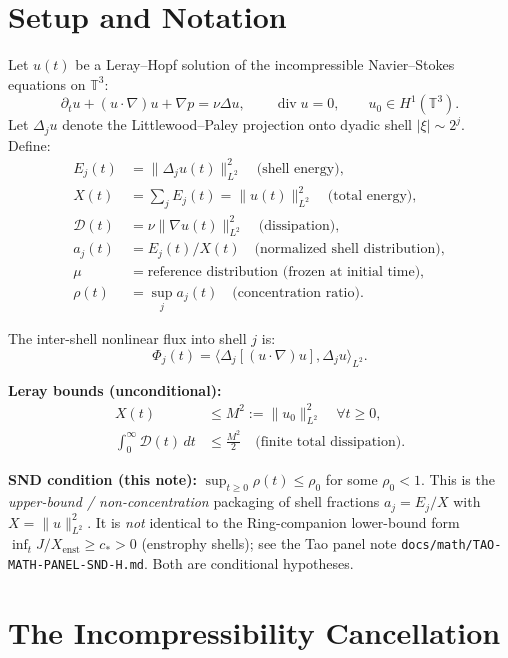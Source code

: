 \documentclass[11pt]{article}
\begin{document}
\section{Setup and Notation}

Let $u(t)$ be a Leray--Hopf solution of the incompressible Navier--Stokes
equations on $\mathbb{T}^3$:
\[
\partial_t u + (u\cdot\nabla)u + \nabla p = \nu\Delta u,
\qquad \operatorname{div}u = 0,
\qquad u_0 \in H^1(\mathbb{T}^3).
\]
Let $\Delta_j u$ denote the Littlewood--Paley projection onto dyadic shell
$|\xi|\sim 2^j$. Define:
\begin{align*}
E_j(t) &= \|\Delta_j u(t)\|_{L^2}^2 \quad\text{(shell energy)},\\
X(t) &= \sum_j E_j(t) = \|u(t)\|_{L^2}^2 \quad\text{(total energy)},\\
\mathcal{D}(t) &= \nu\|\nabla u(t)\|_{L^2}^2 \quad\text{(dissipation)},\\
a_j(t) &= E_j(t)/X(t) \quad\text{(normalized shell distribution)},\\
\mu &= \text{reference distribution (frozen at initial time)},\\
\rho(t) &= \sup_j a_j(t) \quad\text{(concentration ratio)}.
\end{align*}

The inter-shell nonlinear flux into shell $j$ is:
\[
\Phi_j(t) = \langle \Delta_j[(u\cdot\nabla)u], \Delta_j u\rangle_{L^2}.
\]

\textbf{Leray bounds (unconditional):}
\begin{align}
X(t) &\leq M^2 := \|u_0\|_{L^2}^2 \quad\forall t\geq 0, \label{eq:L1}\tag{L1}\\
\int_0^\infty \mathcal{D}(t)\,dt &\leq \frac{M^2}{2} \quad\text{(finite total dissipation).}\label{eq:L2}\tag{L2}
\end{align}

\textbf{SND condition (this note):} $\sup_{t\geq 0}\rho(t) \leq \rho_0$ for some $\rho_0 < 1$.
This is the \emph{upper-bound / non-concentration} packaging of shell fractions
$a_j=E_j/X$ with $X=\|u\|_{L^2}^2$.
It is \emph{not} identical to the Ring-companion lower-bound form
$\inf_t J/X_{\mathrm{enst}}\ge c_*>0$ (enstrophy shells); see the Tao panel note
\texttt{docs/math/TAO-MATH-PANEL-SND-H.md}. Both are conditional hypotheses.

\section{The Incompressibility Cancellation}
\end{document}
